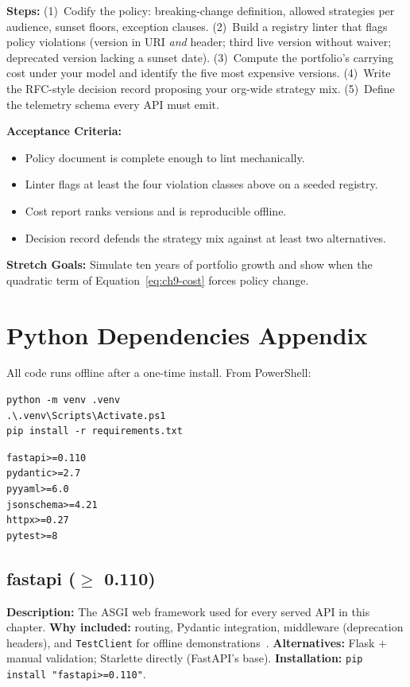 \textbf{Steps:} (1)~Codify the policy: breaking-change definition, allowed
strategies per audience, sunset floors, exception clauses. (2)~Build a
registry linter that flags policy violations (version in URI \emph{and}
header; third live version without waiver; deprecated version lacking a
sunset date). (3)~Compute the portfolio's carrying cost under your model and
identify the five most expensive versions. (4)~Write the RFC-style decision
record proposing your org-wide strategy mix. (5)~Define the telemetry schema
every API must emit.

\textbf{Acceptance Criteria:}
\begin{itemize}
  \item[$\square$] Policy document is complete enough to lint mechanically.
  \item[$\square$] Linter flags at least the four violation classes above on
        a seeded registry.
  \item[$\square$] Cost report ranks versions and is reproducible offline.
  \item[$\square$] Decision record defends the strategy mix against at least
        two alternatives.
\end{itemize}

\textbf{Stretch Goals:} Simulate ten years of portfolio growth and show when
the quadratic term of Equation~\ref{eq:ch9-cost} forces policy change.

\section{Python Dependencies Appendix}
\label{sec:ch9-deps}

All code runs offline after a one-time install. From PowerShell:

\begin{verbatim}
python -m venv .venv
.\.venv\Scripts\Activate.ps1
pip install -r requirements.txt
\end{verbatim}

\begin{verbatim}
fastapi>=0.110
pydantic>=2.7
pyyaml>=6.0
jsonschema>=4.21
httpx>=0.27
pytest>=8
\end{verbatim}

\subsection{fastapi ($\geq$ 0.110)}
\textbf{Description:} The ASGI web framework used for every served API in
this chapter. \textbf{Why included:} routing, Pydantic integration,
middleware (deprecation headers), and \texttt{TestClient} for offline
demonstrations~\cite{fastapidocs}. \textbf{Alternatives:} Flask + manual
validation; Starlette directly (FastAPI's base). \textbf{Installation:}
\texttt{pip install "fastapi>=0.110"}.

